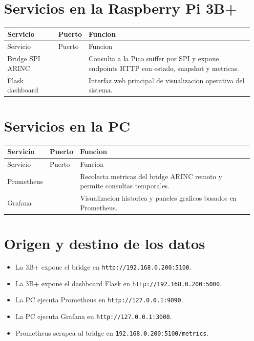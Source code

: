 \documentclass[12pt,a4paper]{report}
\begin{document}
\section{Servicios en la Raspberry Pi 3B+}

\begin{longtable}{>{\raggedright\arraybackslash}p{3cm} >{\raggedright\arraybackslash}p{2cm} >{\raggedright\arraybackslash}p{8cm}}
\toprule
Servicio & Puerto & Funcion \\
\midrule
\endfirsthead
\toprule
Servicio & Puerto & Funcion \\
\midrule
\endhead
Bridge SPI ARINC & 5100 & Consulta a la Pico sniffer por SPI y expone endpoints HTTP con estado, snapshot y metricas. \\
Flask dashboard & 5000 & Interfaz web principal de visualizacion operativa del sistema. \\
\bottomrule
\end{longtable}

\section{Servicios en la PC}

\begin{longtable}{>{\raggedright\arraybackslash}p{3cm} >{\raggedright\arraybackslash}p{2cm} >{\raggedright\arraybackslash}p{8cm}}
\toprule
Servicio & Puerto & Funcion \\
\midrule
\endfirsthead
\toprule
Servicio & Puerto & Funcion \\
\midrule
\endhead
Prometheus & 9090 & Recolecta metricas del bridge ARINC remoto y permite consultas temporales. \\
Grafana & 3000 & Visualizacion historica y paneles graficos basados en Prometheus. \\
\bottomrule
\end{longtable}

\section{Origen y destino de los datos}

\begin{itemize}
    \item La 3B+ expone el bridge en \texttt{http://192.168.0.200:5100}.
    \item La 3B+ expone el dashboard Flask en \texttt{http://192.168.0.200:5000}.
    \item La PC ejecuta Prometheus en \texttt{http://127.0.0.1:9090}.
    \item La PC ejecuta Grafana en \texttt{http://127.0.0.1:3000}.
    \item Prometheus scrapea al bridge en \texttt{192.168.0.200:5100/metrics}.
\end{itemize}
\end{document}
